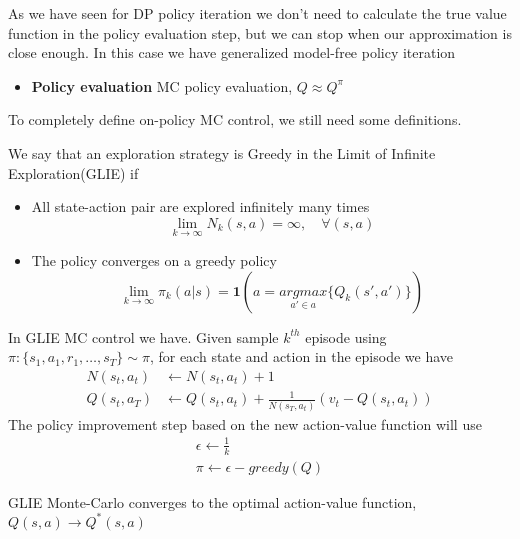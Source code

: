 \documentclass[../main.tex]{subfiles}
\begin{document}
As we have seen for DP policy iteration we don't need to calculate the true value function in the policy evaluation step, but we can stop when our approximation is close enough. In this case we have generalized model-free policy iteration
\begin{itemize}
    \item \textbf{Policy evaluation} MC policy evaluation, $Q \approx Q^{\pi}$
\end{itemize}
To completely define on-policy MC control, we still need some definitions.
\begin{definition}[GLIE]
    We say that an exploration strategy is Greedy in the Limit of Infinite Exploration(GLIE) if
    \begin{itemize}
        \item All state-action pair are explored infinitely many times
              \begin{equation*}
                  \lim_{k \rightarrow \infty} N_k(s,a) = \infty, \quad \forall(s,a)
              \end{equation*}
        \item The policy converges on a greedy policy
              \begin{equation*}
                  \lim_{k \rightarrow \infty} \pi_k(a|s) = \mathbf{1}(a = \underset{a' \in a}{argmax}\{ Q_k(s',a') \})
              \end{equation*}
    \end{itemize}
\end{definition}
\par\noindent
In GLIE MC control we have. Given sample $k^{th}$ episode using $\pi:\{ s_1,a_1,r_1,\dots,s_T \} \sim \pi$, for each state and action in the episode we have
\begin{align*}
    N(s_t,a_t)  & \leftarrow N(s_t,a_t) + 1                                      \\
    Q(s_t, a_T) & \leftarrow Q(s_t,a_t) + \frac{1}{N(s_T,a_t)}(v_t - Q(s_t,a_t))
\end{align*}
The policy improvement step based on the new action-value function will use
\begin{gather*}
    \epsilon \leftarrow \frac{1}{k} \\
    \pi \leftarrow \epsilon-greedy(Q)
\end{gather*}
\begin{theorem}
    GLIE Monte-Carlo converges to the optimal action-value function, $Q(s,a) \rightarrow Q^*(s,a)$
\end{theorem}
\end{document}

